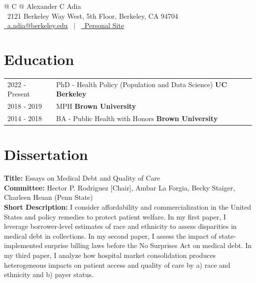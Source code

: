 \documentclass[letterpaper,11pt]{article}
\begin{document}
\pagestyle{plain} 



\begin{tabularx}{\linewidth}{@{} C @{}}
\Huge{Alexander C Adia} \\[7.5pt]
\raisebox{-0.05\height}\faCompass\ 2121 Berkeley Way West, 5th Floor, Berkeley, CA 94704  \\
\href{mailto:a.adia@berkeley.edu}{\raisebox{-0.05\height}\faEnvelope \ a.adia@berkeley.edu} \ $|$ \ \href{http://adiaac.github.io}{\raisebox{-0.05\height}\faGlobe \ Personal Site} \ 
\end{tabularx}


\section{Education}
\begin{tabularx}{\linewidth}{@{}l X@{}}	
2022 - Present & PhD - Health Policy (Population and Data Science) \hfill \normalsize  \textbf{UC Berkeley} \\
2018 - 2019 & MPH \hfill \normalsize  \textbf{Brown University} \\
2014 - 2018 & BA - Public Health with Honors \hfill \normalsize  \textbf{Brown University} \\

\end{tabularx}

\section{Dissertation}
\textbf{Title:} Essays on Medical Debt and Quality of Care\\
\textbf{Committee:} Hector P. Rodriguez [Chair], Ambar La Forgia, Becky Staiger, Charleen Hsuan (Penn State) \\
\textbf{Short Description:} I consider affordability and commercialization in the United States and policy remedies to protect patient welfare. In my first paper, I leverage borrower-level estimates of race and ethnicity to assess disparities in medical debt in collections. In my second paper, I assess the impact of state-implemented surprise billing laws before the No Surprises Act on medical debt. In my third paper, I analyze how hospital market consolidation produces heterogeneous impacts on patient access and quality of care by a) race and ethnicity and b) payer status.
\end{document}
